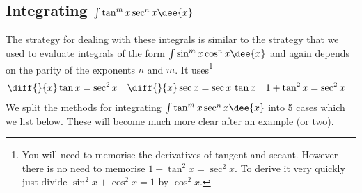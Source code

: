 \subsection{Integrating $\int \tan^m x\sec^n x\dee{x}$}\label{sec:tansec}
The strategy for dealing with these integrals is similar to the
strategy that we used to evaluate integrals of the form
$\int \sin^m x\cos^n x\dee{x}$ and again depends on the parity of the exponents $n$ and
$m$. It uses\footnote{You will need to memorise the
derivatives of tangent and secant. However there is no need to memorise
$1+\tan^2x = \sec^2 x$. To derive it very quickly just divide $\sin^2 x+\cos^2 x = 1$ by
$\cos^2 x$.}
\begin{align*}
\diff{}{x}\tan x &= \sec^2 x &
\diff{}{x}\sec x &= \sec x\,\tan x &
1+\tan^2x &= \sec^2 x
\end{align*}
We split the methods for integrating $\int \tan^m x\sec^n x\dee{x}$ into 5 cases which we
list below. These will become much more clear after an example (or two).
